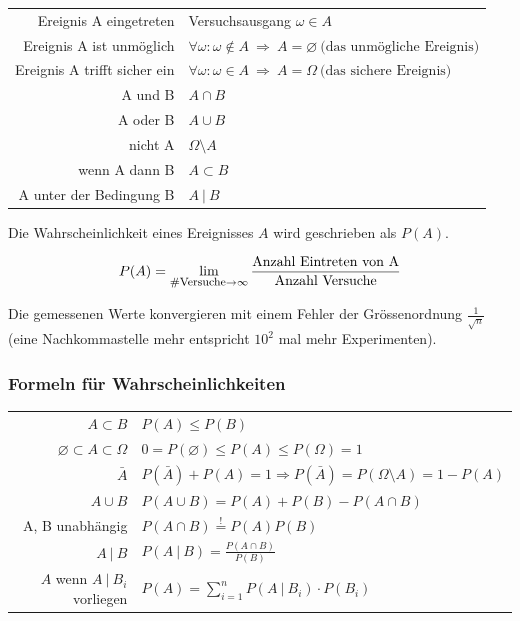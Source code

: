 \documentclass[10pt,a4paper]{scrartcl}
\newif\ifincludeExamples
\begin{document}
\begin{center}
\begin{tabular}{rl}
Ereignis A eingetreten & Versuchsausgang $\omega \in A$ \\ 
Ereignis A ist unmöglich & $\forall \omega: \omega \notin A \ \Rightarrow \ A = \varnothing \ \text{(das unmögliche Ereignis)}$  \\ 
Ereignis A trifft sicher ein & $\forall \omega: \omega \in A \ \Rightarrow \ A = \Omega \ \text{(das sichere Ereignis)}$ \\ 
A und B & $A \cap B$ \\ 
A oder B & $A \cup B$ \\ 
nicht A & $\Omega \setminus A$ \\ 
wenn A dann B & $A \subset B$  \\ 
A unter der Bedingung B & $A\ |\ B$ \\
\end{tabular}
\end{center}

Die Wahrscheinlichkeit eines Ereignisses $A$ wird geschrieben als $P(A)$.

$$P(A) = \lim_{\text{\footnotesize\#Versuche} \rightarrow \infty} \frac{\text{Anzahl Eintreten von A}}{\text{Anzahl Versuche}}$$

\ifincludeExamples
Beispiel fairer (7er-)Würfel: $$P(\{7\}) = \frac{1}{7},\ P(G) = \frac{3}{7}, \ P(\varnothing) = 0, \ P(\Omega) = 1$$
\fi

Die gemessenen Werte konvergieren mit einem Fehler der Grössenordnung $\frac{1}{\sqrt{n}}$ (eine Nachkommastelle mehr entspricht $10^2$ mal mehr Experimenten).

\subsubsection{Formeln für Wahrscheinlichkeiten} 

\begin{center}
\begin{tabular}{rl}
$A \subset B$ & $P(A) \leq P(B)$ \\
$\varnothing \subset A \subset \Omega$ & $0 = P(\varnothing) \leq P(A) \leq P(\Omega) = 1$ \\
$\bar{A}$ & $P(\bar{A}) + P(A) = 1 \Rightarrow P(\bar{A}) = P(\Omega \setminus A) = 1 - P(A)$ \\
$A \cup B$ & $ P(A\cup B) = P(A) + P(B) - P(A\cap B)$ \\
A, B unabhängig & $P(A\cap B) \stackrel{!}{=} P(A)P(B)$\\[2pt]
$A\ |\ B$ & $P(A\ |\ B) = \frac{P(A\cap B)}{P(B)}$ \\[2pt]
$A$ wenn $A\ |\ B_i$ vorliegen & $ P(A) = \sum_{i=1}^n P(A\ |\ B_i) \cdot P(B_i) $
\end{tabular}
\end{center}
\end{document}
